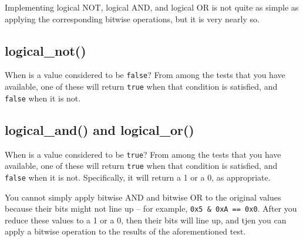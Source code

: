 \begin{description}
\end{description}


\vspace{1cm}

Implementing logical NOT, logical AND, and logical OR is not quite as simple as applying the corresponding bitwise operations, but it is very nearly so.

\subsection{logical\_not()}

When is a value considered to be \lstinline{false}?
From among the tests that you have available, one of these will return \lstinline{true} when that condition is satisfied, and \lstinline{false} when it is not.

\begin{description}
\end{description}

\subsection{logical\_and() and logical\_or()}

When is a value considered to be \lstinline{true}?
From among the tests that you have available, one of these will return \lstinline{true} when that condition is satisfied, and \lstinline{false} when it is not.
Specifically, it will return a 1 or a 0, as appropriate.

You cannot simply apply bitwise AND and bitwise OR to the original values because their bits might not line up -- for example, \lstinline{0x5 & 0xA == 0x0}.
After you reduce these values to a 1 or a 0, then their bits will line up, and tjen you can apply a bitwise operation to the results of the aforementioned test.

\begin{description}
\end{description}

